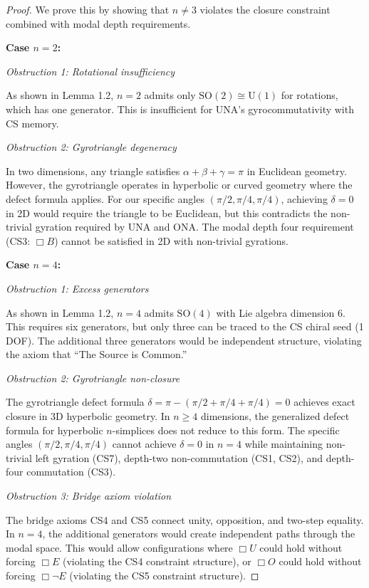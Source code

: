 \documentclass[11pt,a4paper]{article}
\theoremstyle{definition}
\theoremstyle{remark}
\begin{document}
\begin{proof}
We prove this by showing that $n \neq 3$ violates the closure constraint combined with modal depth requirements.

\textbf{Case $n = 2$:}

\textit{Obstruction 1: Rotational insufficiency}

As shown in Lemma 1.2, $n = 2$ admits only $\mathrm{SO}(2) \cong \mathrm{U}(1)$ for rotations, which has one generator. This is insufficient for UNA's gyrocommutativity with CS memory.

\textit{Obstruction 2: Gyrotriangle degeneracy}

In two dimensions, any triangle satisfies $\alpha + \beta + \gamma = \pi$ in Euclidean geometry. However, the gyrotriangle operates in hyperbolic or curved geometry where the defect formula applies. For our specific angles $(\pi/2, \pi/4, \pi/4)$, achieving $\delta = 0$ in 2D would require the triangle to be Euclidean, but this contradicts the non-trivial gyration required by UNA and ONA. The modal depth four requirement (CS3: $\Box B$) cannot be satisfied in 2D with non-trivial gyrations.

\textbf{Case $n = 4$:}

\textit{Obstruction 1: Excess generators}

As shown in Lemma 1.2, $n = 4$ admits $\mathrm{SO}(4)$ with Lie algebra dimension 6. This requires six generators, but only three can be traced to the CS chiral seed (1 DOF). The additional three generators would be independent structure, violating the axiom that ``The Source is Common.''

\textit{Obstruction 2: Gyrotriangle non-closure}

The gyrotriangle defect formula $\delta = \pi - (\pi/2 + \pi/4 + \pi/4) = 0$ achieves exact closure in 3D hyperbolic geometry. In $n \geq 4$ dimensions, the generalized defect formula for hyperbolic $n$-simplices does not reduce to this form. The specific angles $(\pi/2, \pi/4, \pi/4)$ cannot achieve $\delta = 0$ in $n = 4$ while maintaining non-trivial left gyration (CS7), depth-two non-commutation (CS1, CS2), and depth-four commutation (CS3).

\textit{Obstruction 3: Bridge axiom violation}

The bridge axioms CS4 and CS5 connect unity, opposition, and two-step equality. In $n = 4$, the additional generators would create independent paths through the modal space. This would allow configurations where $\Box U$ could hold without forcing $\Box E$ (violating the CS4 constraint structure), or $\Box O$ could hold without forcing $\Box\neg E$ (violating the CS5 constraint structure).


\end{proof}
\end{document}
